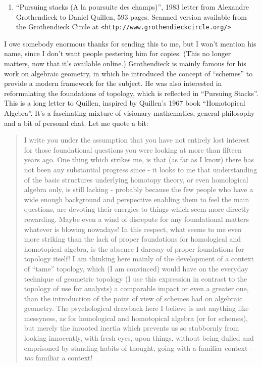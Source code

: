 \documentclass{article}
\def\tightlist{}
\begin{document}
\begin{enumerate}
\def\labelenumi{\arabic{enumi})}
\tightlist
\item
  ``Pursuing stacks (A la poursuite des champs)'', 1983 letter from
  Alexandre Grothendieck to Daniel Quillen, 593 pages. Scanned version
  available from the Grothendieck Circle at
  \texttt{\textless{}http://www.grothendieckcircle.org/\textgreater{}}
\end{enumerate}

I owe somebody enormous thanks for sending this to me, but I won't
mention his name, since I don't want people pestering him for copies.
(This no longer matters, now that it's available online.) Grothendieck
is mainly famous for his work on algebraic geometry, in which he
introduced the concept of ``schemes'' to provide a modern framework for
the subject. He was also interested in reformulating the foundations of
topology, which is reflected in ``Pursuing Stacks''. This is a long
letter to Quillen, inspired by Quillen's 1967 book ``Homotopical
Algebra''. It's a fascinating mixture of visionary mathematics, general
philosophy and a bit of personal chat. Let me quote a bit:

\begin{quote}
I write you under the assumption that you have not entirely lost
interest for those foundational questions you were looking at more than
fifteen years ago. One thing which strikes me, is that (as far as I
know) there has not been any substantial progress since - it looks to me
that understanding of the basic structures underlying homotopy theory,
or even homological algebra only, is still lacking - probably because
the few people who have a wide enough background and perspective
enabling them to feel the main questions, are devoting their energies to
things which seem more directly rewarding. Maybe even a wind of
disrepute for any foundational matters whatever is blowing nowadays! In
this respect, what seems to me even more striking than the lack of
proper foundations for homological and homotopical algebra, is the
absence I daresay of proper foundations for topology itself! I am
thinking here mainly of the development of a context of ``tame''
topology, which (I am convinced) would have on the everyday technique of
geometric topology (I use this expression in contrast to the topology of
use for analysts) a comparable impact or even a greater one, than the
introduction of the point of view of schemes had on algebraic geometry.
The psychological drawback here I believe is not anything like
messyness, as for homological and homotopical algebra (or for schemes),
but merely the inrooted inertia which prevents us so stubbornly from
looking innocently, with fresh eyes, upon things, without being dulled
and emprisoned by standing habits of thought, going with a familiar
context - \emph{too} familiar a context!
\end{quote}
\end{document}
